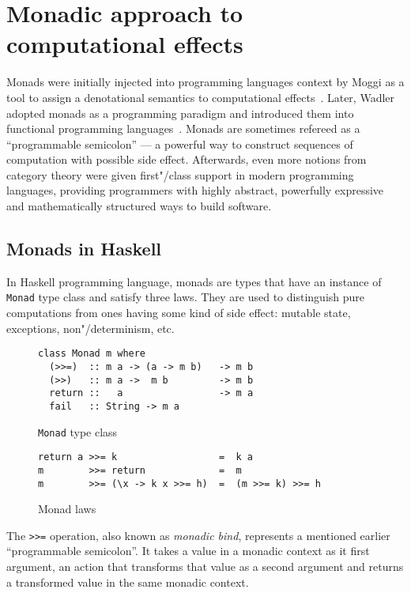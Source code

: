 \chapter{Monadic approach to computational effects}
\label{cpt-parsers}

  Monads were initially injected into programming languages context by Moggi as a tool to
  assign a denotational semantics to computational effects~\cite{Moggi:1991:NCM:116981.116984}. Later, Wadler adopted monads as a programming
  paradigm and introduced them into functional programming languages~\cite{Wadler:1992:EFP:143165.143169}. Monads are sometimes refereed as a ``programmable semicolon'' --- a powerful way to construct sequences of computation with possible side effect. Afterwards, even more notions from category theory were given first"/class support in modern programming languages, providing programmers with highly abstract, powerfully expressive and mathematically structured ways to build software.

    \section{Monads in Haskell}

    In Haskell programming language, monads are types that have an instance of \texttt{Monad} type class and satisfy three laws. They are used
    to distinguish pure computations from ones having some kind of side effect:
    mutable state, exceptions, non"/determinism, etc.

    \begin{figure}[h]
    \begin{lstlisting}
class Monad m where
  (>>=)  :: m a -> (a -> m b)   -> m b
  (>>)   :: m a ->  m b         -> m b
  return ::   a                 -> m a
  fail   :: String -> m a
    \end{lstlisting}
    \caption{\texttt{Monad} type class}
    \label{listing:monadClass}
    \end{figure}

    \begin{figure}[h]
    \begin{lstlisting}
return a >>= k                  =  k a
m        >>= return             =  m
m        >>= (\x -> k x >>= h)  =  (m >>= k) >>= h
    \end{lstlisting}
    \caption{Monad laws}
    \label{listing:monadLaws}
    \end{figure}

    The \lstinline{>>=} operation, also known as \emph{monadic bind}, represents
    a mentioned earlier ``programmable semicolon''. It takes a value in a monadic context as it first argument, an action that transforms that value as a second argument and returns a transformed value in the same monadic context.

